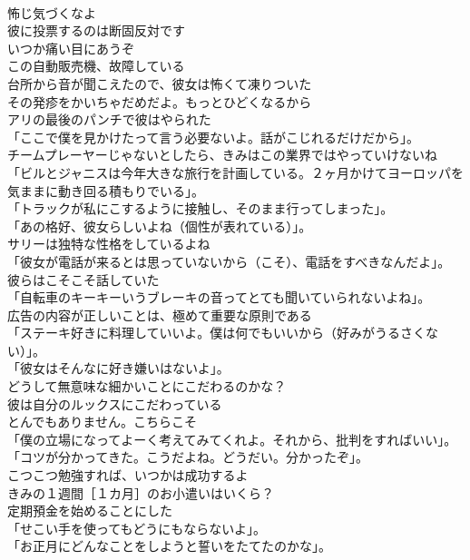 \documentclass[8pt]{extreport}
\begin{document}
\begin{CJK}{UTF8}{min}
\\	怖じ気づくなよ	
\\	彼に投票するのは断固反対です	
\\	いつか痛い目にあうぞ	
\\	この自動販売機、故障している	
\\	台所から音が聞こえたので、彼女は怖くて凍りついた	
\\	その発疹をかいちゃだめだよ。もっとひどくなるから	
\\	アリの最後のパンチで彼はやられた	
\\	「ここで僕を見かけたって言う必要ないよ。話がこじれるだけだから」。	
\\	チームプレーヤーじゃないとしたら、きみはこの業界ではやっていけないね	
\\	「ビルとジャニスは今年大きな旅行を計画している。２ヶ月かけてヨーロッパを気ままに動き回る積もりでいる」。	
\\	「トラックが私にこするように接触し、そのまま行ってしまった」。	
\\	「あの格好、彼女らしいよね（個性が表れている）」。	
\\	サリーは独特な性格をしているよね	
\\	「彼女が電話が来るとは思っていないから（こそ）、電話をすべきなんだよ」。	
\\	彼らはこそこそ話していた	
\\	「自転車のキーキーいうブレーキの音ってとても聞いていられないよね」。	
\\	広告の内容が正しいことは、極めて重要な原則である	
\\	「ステーキ好きに料理していいよ。僕は何でもいいから（好みがうるさくない）」。	
\\	「彼女はそんなに好き嫌いはないよ」。	
\\	どうして無意味な細かいことにこだわるのかな？	
\\	彼は自分のルックスにこだわっている	
\\	とんでもありません。こちらこそ	
\\	「僕の立場になってよーく考えてみてくれよ。それから、批判をすればいい」。	
\\	「コツが分かってきた。こうだよね。どうだい。分かったぞ」。	
\\	こつこつ勉強すれば、いつかは成功するよ	
\\	きみの１週間［１カ月］のお小遣いはいくら？	
\\	定期預金を始めることにした	
\\	「せこい手を使ってもどうにもならないよ」。	
\\	「お正月にどんなことをしようと誓いをたてたのかな」。	

\end{CJK}
\end{document}
